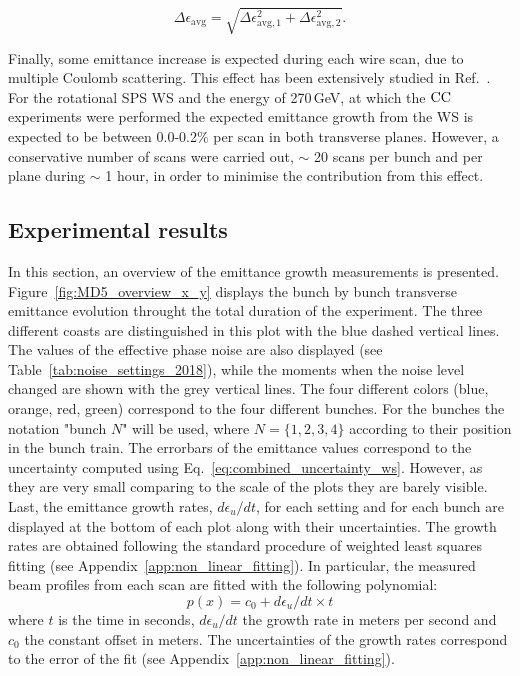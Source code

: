 \begin{equation}\label{eq:combined_uncertainty_ws}
   \Delta \epsilon_\mathrm{avg} = \sqrt{\Delta \epsilon_\mathrm{avg, 1} ^2 + \Delta \epsilon_\mathrm{avg, 2} ^2}.
\end{equation}

Finally, some emittance increase is expected during each wire scan, due to multiple Coulomb scattering. This effect has been extensively studied in Ref.~\cite{Roncarolo:1481835}. For the rotational SPS WS and the energy of 270\,GeV, at which the ${\mathrm{CC}}$ experiments were performed the expected emittance growth from the WS is expected to be between 0.0-0.2$\%$ per scan in both transverse planes. However, a conservative number of scans were carried out, $\sim$ 20 scans per bunch and per plane during $\sim$ 1 hour, in order to minimise the contribution from this effect.

\subsection{Experimental results}\label{sec:MD5_overview}
In this section, an overview of the emittance growth measurements is presented. Figure~\ref{fig:MD5_overview_x_y} displays the bunch by bunch transverse emittance evolution throught the total duration of the experiment. The three different coasts are distinguished in this plot with the blue dashed vertical lines. The values of the effective phase noise are also displayed (see Table~\ref{tab:noise_settings_2018}), while the moments when the noise level changed are shown with the grey vertical lines. The four different colors (blue, orange, red, green) correspond to the four different bunches. For the bunches the notation "bunch $N$" will be used, where $N=\{1,2,3,4\}$ according to their position in the bunch train. The errorbars of the emittance values correspond to the uncertainty computed using Eq.~\ref{eq:combined_uncertainty_ws}. However, as they are very small comparing to the scale of the plots they are barely visible. Last, the emittance growth rates, $d\epsilon_u /dt$, for each setting and for each bunch are displayed at the bottom of each plot along with their uncertainties. The growth rates are obtained following the standard procedure of weighted least squares fitting (see Appendix~\ref{app:non_linear_fitting}). In particular, the measured beam profiles from each scan are fitted with the following polynomial:
\begin{equation}\label{eq:polynimial_for_linear_fit}
   p(x) = c_0 + d\epsilon_u /dt \times t
\end{equation}
where $t$ is the time in seconds, $d\epsilon_u /dt$ the growth rate in meters per second and $c_0$ the constant offset in meters. The uncertainties of the growth rates correspond to the error of the fit (see Appendix~\ref{app:non_linear_fitting}). 

